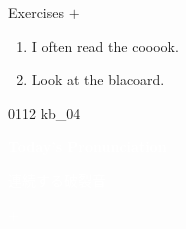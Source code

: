 \documentclass[aspectratio=169,xcolor={dvipsnames,table}]{beamer}
\begin{document}
\begin{frame}[plain]{Exercises  $+$ }
  \Large
  \begin{enumerate}
    \item<2-> I often read the cooook.
    \item<4-> Look at the blacoard.
  \end{enumerate}

  \hfill{\tiny 0112}\,{\scriptsize {}\,kb\_04}

\end{frame}
\begin{frame}

  \hypertarget{today}{}
  \centering
  \textcolor{white}{\Huge\bfseries Today's Pronunciation}

  \vspace{30pt}

  \textcolor{white}{\Large 連続する破裂音}

  \textcolor{white}{\Large {} $+$ }
\end{frame}
\end{document}
